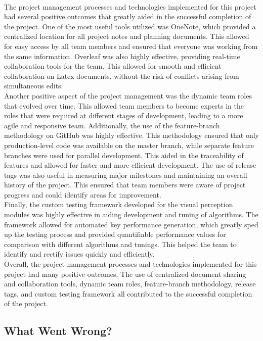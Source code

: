 \documentclass{article}
\begin{document}
\\ \indent The project management processes and technologies implemented for this project had several positive outcomes that greatly aided in the successful completion of the project. One of the most useful tools utilized was OneNote, which provided a centralized location for all project notes and planning documents. This allowed for easy access by all team members and ensured that everyone was working from the same information. Overleaf was also highly effective, providing real-time collaboration tools for the team. This allowed for smooth and efficient collaboration on Latex documents, without the risk of conflicts arising from simultaneous edits.
\\ \indent Another positive aspect of the project management was the dynamic team roles that evolved over time. This allowed team members to become experts in the roles that were required at different stages of development, leading to a more agile and responsive team. Additionally, the use of the feature-branch methodology on GitHub was highly effective. This methodology ensured that only production-level code was available on the master branch, while separate feature branches were used for parallel development. This aided in the traceability of features and allowed for faster and more efficient development.
The use of release tags was also useful in measuring major milestones and maintaining an overall history of the project. This ensured that team members were aware of project progress and could identify areas for improvement.
\\ \indent Finally, the custom testing framework developed for the visual perception modules was highly effective in aiding development and tuning of algorithms. The framework allowed for automated key performance generation, which greatly sped up the testing process and provided quantifiable performance values for comparison with different algorithms and tunings. This helped the team to identify and rectify issues quickly and efficiently.
\\ \indent Overall, the project management processes and technologies implemented for this project had many positive outcomes. The use of centralized document sharing and collaboration tools, dynamic team roles, feature-branch methodology, release tags, and custom testing framework all contributed to the successful completion of the project.

\subsection{What Went Wrong?}
\end{document}
